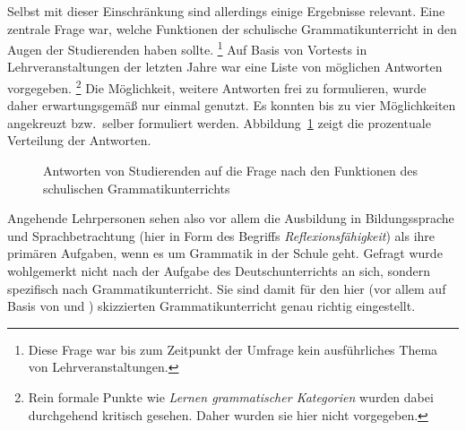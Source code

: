 Selbst mit dieser Einschränkung sind allerdings einige Ergebnisse relevant.
Eine zentrale Frage war, welche Funktionen der schulische Grammatikunterricht in den Augen der Studierenden haben sollte.%
\footnote{Diese Frage war bis zum Zeitpunkt der Umfrage kein ausführliches Thema von Lehrveranstaltungen.}
Auf Basis von Vortests in Lehrveranstaltungen der letzten Jahre war eine Liste von möglichen Antworten vorgegeben.%
\footnote{Rein formale Punkte wie \textit{Lernen grammatischer Kategorien} wurden dabei durchgehend kritisch gesehen.
Daher wurden sie hier nicht vorgegeben.}
Die Möglichkeit, weitere Antworten frei zu formulieren, wurde daher erwartungsgemäß nur einmal genutzt.
Es konnten bis zu vier Möglichkeiten angekreuzt bzw.\ selber formuliert werden.
Abbildung~\ref{fig:studentischesichtweisenaufstudiumundschulunterricht001} zeigt die prozentuale Verteilung der Antworten.

\begin{figure}[htpb]
  \centering
  \caption{Antworten von Studierenden auf die Frage nach den Funktionen des schulischen Grammatikunterrichts}
  \label{fig:studentischesichtweisenaufstudiumundschulunterricht001}
\end{figure}

Angehende Lehrpersonen sehen also vor allem die Ausbildung in Bildungssprache und Sprachbetrachtung (hier in Form des Begriffs \textit{Reflexionsfähigkeit}) als ihre primären Aufgaben, wenn es um Grammatik in der Schule geht.
Gefragt wurde wohlgemerkt nicht nach der Aufgabe des Deutschunterrichts an sich, sondern spezifisch nach Grammatikunterricht.
Sie sind damit für den hier (vor allem auf Basis von \citealt{Eisenberg2004} und \citealt{Bredel2013}) skizzierten Grammatikunterricht genau richtig eingestellt.

